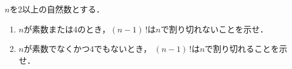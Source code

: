 \documentclass[../../main.tex]{subfiles}
\begin{document}
$n$を2以上の自然数とする．
\begin{enumerate}
  \item$n$が素数または4のとき，$(n-1) \, !$は$n$で割り切れないことを示せ．
  \item$n$が素数でなくかつ4でもないとき，
    $(n-1) \, !$は$n$で割り切れることを示せ．
\end{enumerate}
\end{document}
